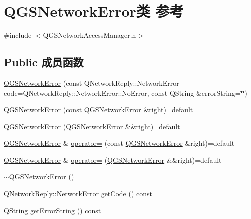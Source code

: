 \hypertarget{class_q_g_s_network_error}{}\section{Q\+G\+S\+Network\+Error类 参考}
\label{class_q_g_s_network_error}


{\ttfamily \#include $<$Q\+G\+S\+Network\+Access\+Manager.\+h$>$}

\subsection*{Public 成员函数}
\begin{DoxyCompactItemize}
\item 
\mbox{\hyperlink{class_q_g_s_network_error_a7a6bb498b38c7eb7b832e04b7be52d07}{Q\+G\+S\+Network\+Error}} (const Q\+Network\+Reply\+::\+Network\+Error code=Q\+Network\+Reply\+::\+Network\+Error\+::\+No\+Error, const Q\+String \&error\+String=\char`\"{}\char`\"{})
\item 
\mbox{\hyperlink{class_q_g_s_network_error_ada48d70e337d97a106391051cec93b26}{Q\+G\+S\+Network\+Error}} (const \mbox{\hyperlink{class_q_g_s_network_error}{Q\+G\+S\+Network\+Error}} \&right)=default
\item 
\mbox{\hyperlink{class_q_g_s_network_error_a1225072e2c1a2604aff3f941d4dc1d15}{Q\+G\+S\+Network\+Error}} (\mbox{\hyperlink{class_q_g_s_network_error}{Q\+G\+S\+Network\+Error}} \&\&right)=default
\item 
\mbox{\hyperlink{class_q_g_s_network_error}{Q\+G\+S\+Network\+Error}} \& \mbox{\hyperlink{class_q_g_s_network_error_a92a4a2258f506fcf68f8bc626f68ba8f}{operator=}} (const \mbox{\hyperlink{class_q_g_s_network_error}{Q\+G\+S\+Network\+Error}} \&right)=default
\item 
\mbox{\hyperlink{class_q_g_s_network_error}{Q\+G\+S\+Network\+Error}} \& \mbox{\hyperlink{class_q_g_s_network_error_ab864b5cd7be91694ccc4650a77e44004}{operator=}} (\mbox{\hyperlink{class_q_g_s_network_error}{Q\+G\+S\+Network\+Error}} \&\&right)=default
\item 
\mbox{\hyperlink{class_q_g_s_network_error_a7d80de1480757a12f058f357dc958bde}{$\sim$\+Q\+G\+S\+Network\+Error}} ()
\item 
Q\+Network\+Reply\+::\+Network\+Error \mbox{\hyperlink{class_q_g_s_network_error_a8a7776d6e6c78c8ed5bee49657e0c907}{get\+Code}} () const
\item 
Q\+String \mbox{\hyperlink{class_q_g_s_network_error_ab90300ae16b03887c34e498dfbd5b688}{get\+Error\+String}} () const
\end{DoxyCompactItemize}


